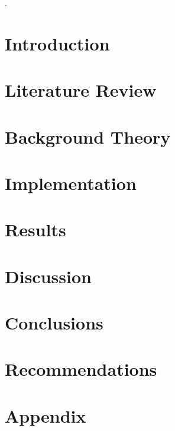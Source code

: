 \documentclass[12pt]{report}
\begin{document}




\newpage

\newpage


\tableofcontents.
\listoffigures

\chapter{Introduction}


\chapter{Literature Review}


\chapter{Background Theory} \label{backTheory}


\chapter{Implementation}


\chapter{Results}


\chapter{Discussion}


\chapter{Conclusions}


\chapter{Recommendations}


\appendix
\chapter{Appendix}


\printbibliography
\end{document}
